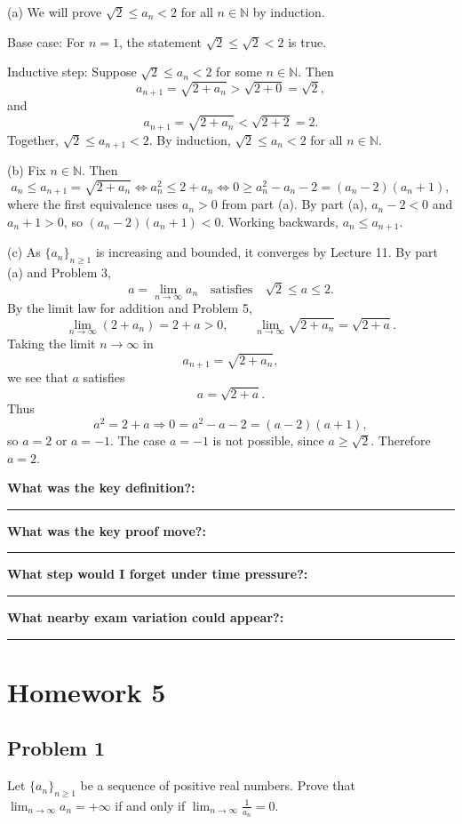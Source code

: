 \documentclass[12pt]{article}
\newcommand{\N}{\mathbb{N}}
\newcommand{\writespace}[1]{\vspace*{#1}}
\newcommand{\fillfieldbig}[2]{%
  \par\noindent\textbf{#1:}\par
  \writespace{#2}
  \noindent\rule{\linewidth}{0.35pt}\par\vspace{0.15in}%
}
\newenvironment{problemstatementbox}[1]{%
  \begin{tcolorbox}[
    enhanced,
    breakable,
    colback=probblue,
    colframe=blue!55!black,
    fonttitle=\bfseries,
    title={Problem Statement\hfill #1}
  ]
}{%
  \end{tcolorbox}
}
\newenvironment{solutionbox}[1]{%
  \begin{tcolorbox}[
    enhanced,
    breakable,
    colback=solgreen,
    colframe=green!45!black,
    fonttitle=\bfseries,
    title={#1}
  ]
}{%
  \end{tcolorbox}
}
\newcommand{\reflectionpage}[1]{%
  \begin{tcolorbox}[
    enhanced,
    colback=reflectcyan,
    colframe=cyan!55!black,
    fonttitle=\bfseries,
    title={Reflection \& Variation\hfill #1},
    height=8.45in
  ]
  \fillfieldbig{What was the key definition?}{1.15in}
  \fillfieldbig{What was the key proof move?}{1.15in}
  \fillfieldbig{What step would I forget under time pressure?}{1.15in}
  \fillfieldbig{What nearby exam variation could appear?}{1.35in}
  \end{tcolorbox}
}
\begin{document}
\newpage
\begin{solutionbox}{Official Solution (Professor)}
(a) We will prove \(\sqrt2\le a_n<2\) for all \(n\in\N\) by induction.

Base case: For \(n=1\), the statement \(\sqrt2\le\sqrt2<2\) is true.

Inductive step: Suppose \(\sqrt2\le a_n<2\) for some \(n\in\N\). Then
\[
  a_{n+1}=\sqrt{2+a_n}>\sqrt{2+0}=\sqrt2,
\]
and
\[
  a_{n+1}=\sqrt{2+a_n}<\sqrt{2+2}=2.
\]
Together, \(\sqrt2\le a_{n+1}<2\). By induction, \(\sqrt2\le a_n<2\) for all \(n\in\N\).

(b) Fix \(n\in\N\). Then
\[
  a_n\le a_{n+1}=\sqrt{2+a_n}
  \Longleftrightarrow
  a_n^2\le 2+a_n
  \Longleftrightarrow
  0\ge a_n^2-a_n-2=(a_n-2)(a_n+1),
\]
where the first equivalence uses \(a_n>0\) from part (a). By part (a), \(a_n-2<0\) and \(a_n+1>0\), so \((a_n-2)(a_n+1)<0\). Working backwards, \(a_n\le a_{n+1}\).

(c) As \(\{a_n\}_{n\ge1}\) is increasing and bounded, it converges by Lecture 11. By part (a) and Problem 3,
\[
  a=\lim_{n\to\infty}a_n
  \quad\text{satisfies}\quad
  \sqrt2\le a\le2.
\]
By the limit law for addition and Problem 5,
\[
  \lim_{n\to\infty}(2+a_n)=2+a>0,
  \qquad
  \lim_{n\to\infty}\sqrt{2+a_n}=\sqrt{2+a}.
\]
Taking the limit \(n\to\infty\) in
\[
  a_{n+1}=\sqrt{2+a_n},
\]
we see that \(a\) satisfies
\[
  a=\sqrt{2+a}.
\]
Thus
\[
  a^2=2+a
  \Longrightarrow
  0=a^2-a-2=(a-2)(a+1),
\]
so \(a=2\) or \(a=-1\). The case \(a=-1\) is not possible, since \(a\ge\sqrt2\). Therefore \(a=2\).
\end{solutionbox}

\newpage
\reflectionpage{Homework 4, Problem 6}

\section{Homework 5}

\newpage
\subsection{Problem 1}

\begin{problemstatementbox}{Homework 5, Problem 1}
Let \(\{a_n\}_{n\ge1}\) be a sequence of positive real numbers. Prove that \(\lim_{n\to\infty} a_n=+\infty\) if and only if \(\lim_{n\to\infty}\frac{1}{a_n}=0\).
\end{problemstatementbox}
\end{document}
